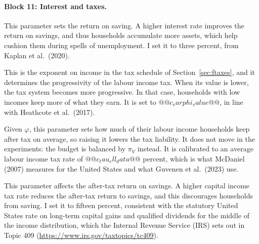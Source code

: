 \documentclass[10pt]{article}
\begin{document}
\paragraph{Block 11: Interest and taxes.}
\begin{description}\setlength{\itemsep}{0.25em}\setlength{\parskip}{0em}
\item[$r$, the risk-free rate.] This parameter sets the return on saving.   A higher interest rate improves the return on savings, and thus households accumulate more assets, which help cushion them during spells of unemployment. I set it to three percent, from Kaplan et al.\
(2020).

\item[$\varphi$, tax progressivity.] This is the exponent on income in the tax schedule of
Section~\ref{sec:ftaxes}, and it determines the progressivity of the labour income tax.   When its value is lower, the tax system becomes more progressive. In that case, households with low incomes keep more of what they earn. It is set to $@@c_varphi_value@@$, in line with Heathcote et al.\ (2017). 

\item[$\tau_{\ell}$, the scale of after-tax labour income.] Given $\varphi$, this parameter sets how much
of their labour income households keep after tax on average, so raising it lowers the tax liability. It does not move in the experiments: the budget is
balanced by $\pi_V$ instead. It is calibrated to
an average labour income tax rate of $@@c_tau_ell_data@@$ percent,
which is what McDaniel (2007) measures for the United States and what Guvenen et al.\ (2023) use.

\item[$\tau_k$, the capital income tax rate.] This parameter affects the after-tax return on savings.   A higher capital income tax rate reduces the after-tax return to savings, and this discourages households from saving. I set it to fifteen percent, consistent
with the statutory United States rate on long-term capital gains and qualified
dividends for the middle of the income distribution, which the Internal Revenue
Service (IRS) sets out in Topic 409
(\url{https://www.irs.gov/taxtopics/tc409}).

\end{description}
\end{document}
